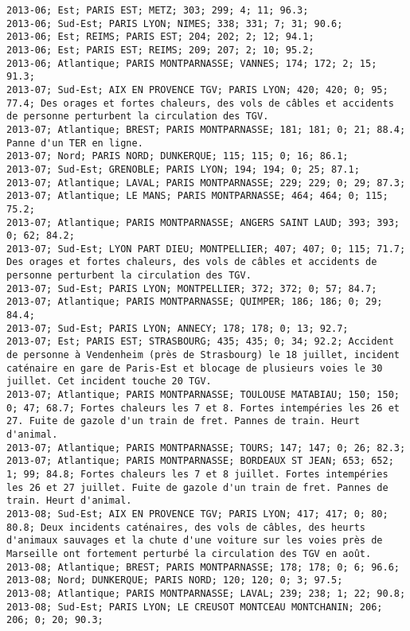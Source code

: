 \documentclass{article}
\begin{document}
\begin{Verbatim}[commandchars=\\\{\}]
2013-06; Est; PARIS EST; METZ; 303; 299; 4; 11; 96.3; 
2013-06; Sud-Est; PARIS LYON; NIMES; 338; 331; 7; 31; 90.6; 
2013-06; Est; REIMS; PARIS EST; 204; 202; 2; 12; 94.1; 
2013-06; Est; PARIS EST; REIMS; 209; 207; 2; 10; 95.2; 
2013-06; Atlantique; PARIS MONTPARNASSE; VANNES; 174; 172; 2; 15; 91.3; 
2013-07; Sud-Est; AIX EN PROVENCE TGV; PARIS LYON; 420; 420; 0; 95; 77.4; Des orages et fortes chaleurs, des vols de câbles et accidents de personne perturbent la circulation des TGV.
2013-07; Atlantique; BREST; PARIS MONTPARNASSE; 181; 181; 0; 21; 88.4; Panne d'un TER en ligne.
2013-07; Nord; PARIS NORD; DUNKERQUE; 115; 115; 0; 16; 86.1; 
2013-07; Sud-Est; GRENOBLE; PARIS LYON; 194; 194; 0; 25; 87.1; 
2013-07; Atlantique; LAVAL; PARIS MONTPARNASSE; 229; 229; 0; 29; 87.3; 
2013-07; Atlantique; LE MANS; PARIS MONTPARNASSE; 464; 464; 0; 115; 75.2; 
2013-07; Atlantique; PARIS MONTPARNASSE; ANGERS SAINT LAUD; 393; 393; 0; 62; 84.2; 
2013-07; Sud-Est; LYON PART DIEU; MONTPELLIER; 407; 407; 0; 115; 71.7; Des orages et fortes chaleurs, des vols de câbles et accidents de personne perturbent la circulation des TGV.
2013-07; Sud-Est; PARIS LYON; MONTPELLIER; 372; 372; 0; 57; 84.7; 
2013-07; Atlantique; PARIS MONTPARNASSE; QUIMPER; 186; 186; 0; 29; 84.4; 
2013-07; Sud-Est; PARIS LYON; ANNECY; 178; 178; 0; 13; 92.7; 
2013-07; Est; PARIS EST; STRASBOURG; 435; 435; 0; 34; 92.2; Accident de personne à Vendenheim (près de Strasbourg) le 18 juillet, incident caténaire en gare de Paris-Est et blocage de plusieurs voies le 30 juillet. Cet incident touche 20 TGV.
2013-07; Atlantique; PARIS MONTPARNASSE; TOULOUSE MATABIAU; 150; 150; 0; 47; 68.7; Fortes chaleurs les 7 et 8. Fortes intempéries les 26 et 27. Fuite de gazole d'un train de fret. Pannes de train. Heurt d'animal.
2013-07; Atlantique; PARIS MONTPARNASSE; TOURS; 147; 147; 0; 26; 82.3; 
2013-07; Atlantique; PARIS MONTPARNASSE; BORDEAUX ST JEAN; 653; 652; 1; 99; 84.8; Fortes chaleurs les 7 et 8 juillet. Fortes intempéries les 26 et 27 juillet. Fuite de gazole d'un train de fret. Pannes de train. Heurt d'animal.
2013-08; Sud-Est; AIX EN PROVENCE TGV; PARIS LYON; 417; 417; 0; 80; 80.8; Deux incidents caténaires, des vols de câbles, des heurts d'animaux sauvages et la chute d'une voiture sur les voies près de Marseille ont fortement perturbé la circulation des TGV en août.
2013-08; Atlantique; BREST; PARIS MONTPARNASSE; 178; 178; 0; 6; 96.6; 
2013-08; Nord; DUNKERQUE; PARIS NORD; 120; 120; 0; 3; 97.5; 
2013-08; Atlantique; PARIS MONTPARNASSE; LAVAL; 239; 238; 1; 22; 90.8; 
2013-08; Sud-Est; PARIS LYON; LE CREUSOT MONTCEAU MONTCHANIN; 206; 206; 0; 20; 90.3; 

\end{Verbatim}
\end{document}
